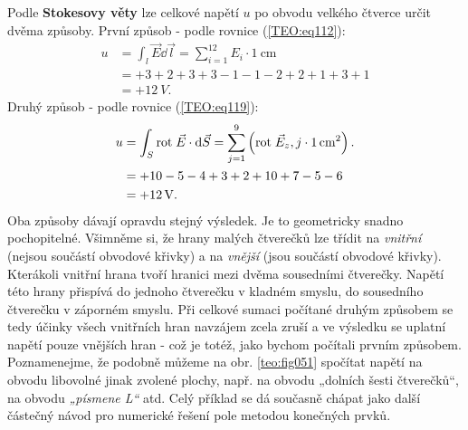 \begin{mdframed}[style=mdexam]
\begin{example}
  Podle \textbf{Stokesovy věty} lze celkové napětí \(u\) po obvodu velkého čtverce určit dvěma 
  způsoby. První způsob - podle rovnice (\ref{TEO:eq112}):
  \begin{align*}
    u &= \int_l\vec{E}\dd{\vec{l}} = \sum\limits_{i=1}^{12}E_i\cdot\SI{1}{\cm}     \\
      &= +3 +2 +3 +3 - 1 - 1 -2 + 2 + 1 + 3 + 1                                \\
      &= + \SI{12}{V}.
  \end{align*}
  Druhý způsob - podle rovnice (\ref{TEO:eq119}):
  \begin{align*}
    u &= \int_S\rot{E} \cdot \dd{\vec{S}} 
       = \sum\limits_{j=1}^{9}\left(\rot{E}_z,j\cdot\SI{1}{\cm^2}\right).      \\
      &= + 10 - 5 - 4 + 3 + 2 + 10 + 7 - 5 - 6                                 \\
      &= + \SI{12}{V}. 
  \end{align*}
  Oba způsoby dávají opravdu stejný výsledek. Je to geometricky snadno pochopitelné. Všimněme 
  si, že hrany malých čtverečků lze třídit na \emph{vnitřní} (nejsou součástí obvodové křivky) a na 
  \emph{vnější} (jsou součástí obvodové křivky). Kterákoli vnitřní hrana tvoří hranici mezi dvěma 
  sousedními čtverečky. Napětí této hrany přispívá do jednoho čtverečku v kladném smyslu, do 
  sousedního čtverečku v záporném smyslu. Při celkové sumaci počítané druhým způsobem se tedy 
  účinky všech vnitřních hran navzájem zcela zruší a ve výsledku se uplatní napětí pouze vnějších 
  hran - což je totéž, jako bychom počítali prvním způsobem. Poznamenejme, že podobně můžeme na 
  obr. \ref{teo:fig051} spočítat napětí na obvodu libovolné jinak zvolené plochy, 
  např. na obvodu „dolních šesti čtverečků“, na obvodu \emph{„písmene L“} atd. Celý příklad se dá 
  současně chápat jako další částečný návod pro numerické řešení pole metodou konečných prvků.
\end{example}
\end{mdframed}